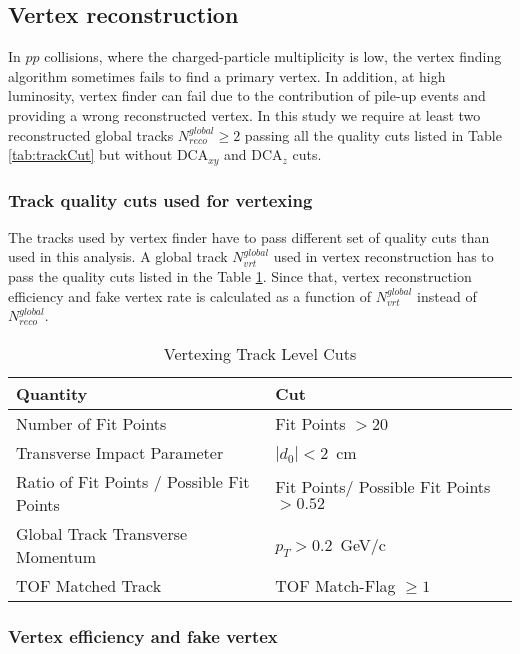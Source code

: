 \subsection{Vertex reconstruction}
In $pp$ collisions, where the charged-particle multiplicity is low, the vertex finding algorithm sometimes fails to find a primary vertex. In addition, at high luminosity, vertex finder can fail due to the contribution of pile-up events and providing a wrong reconstructed vertex. In this study we require at least two reconstructed global tracks $N^{global}_{reco}\geq 2$ passing all the quality cuts listed in Table \ref{tab:trackCut} but without $\textrm{DCA}_{xy}$ and $\textrm{DCA}_{z}$ cuts. 

\subsubsection{Track quality cuts used for vertexing}
The tracks used by vertex finder have to  pass different set of quality cuts than used in this analysis. 
A global track $N^{global}_{vrt}$ used in vertex reconstruction has to pass the quality cuts listed in the Table \ref{tab:trackCutVertex}. Since that, vertex reconstruction efficiency and fake vertex rate is calculated as a function of $N^{global}_{vrt}$ instead of $N^{global}_{reco}$. 


\begin{table}[H]
	\centering
	\begin{tabular}{| l | l |}
		\hline			
		Quantity & Cut \\
		\hline
		\hline
		Number of Fit Points & Fit Points $>20$\\
		Transverse Impact Parameter & $|d_0|<2$~cm\\ 
		Ratio of Fit Points / Possible Fit Points & Fit Points/ Possible Fit Points $>0.52$\\
		Global Track Transverse Momentum & $p_{T}>0.2$~GeV/c\\
		TOF Matched Track & TOF Match-Flag $\geq1$\\
		\hline  
	\end{tabular}
	\caption[Vertexing Track Level Cuts]{Vertexing Track Level Cuts}
	\label{tab:trackCutVertex}
\end{table}
\subsubsection{Vertex efficiency and fake vertex}